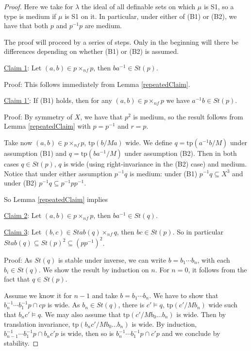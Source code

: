 \documentclass[12pt]{article}
\theoremstyle{definition}
\theoremstyle{mystyle}
\theoremstyle{remark}
\newcommand{\tp}{\mathrm{tp}}
\newcommand{\nf}{\times_{nf}}
\begin{document}
\begin{proof}
Here we take for $\lambda$ the ideal of all definable sets on which $\mu$ is S1, so a type is medium if $\mu$ is S1 on it. In particular, under either of (B1) or (B2), we have that both $p$ and $p^{-1}p$ are medium.

The proof will proceed by a series of steps. Only in the beginning will there be differences depending on whether (B1) or (B2) is assumed.

\smallskip \noindent
\underline{Claim 1}: Let $(a,b)\in p \nf p$, then $ba^{-1}\in St(p)$.

\noindent
Proof: This follows immediately from Lemma \ref{repeatedClaim}.


\smallskip \noindent
\underline{Claim 1'}: If (B1) holds, then for any $(a,b)\in p \nf p$ we have $a^{-1}b\in St(p)$.

\noindent
Proof: By symmetry of $X$, we have that $p^2$ is medium, so the result follows from Lemma \ref{repeatedClaim} with $p=p^{-1}$ and $r=p$.

\medskip

Take now $(a,b)\in p\nf p$, $\tp(b/Ma)$ wide. We define $q=\tp(a^{-1}b/M)$ under assumption (B1) and $q=\tp(ba^{-1}/M)$ under assumption (B2). Then in both cases $q\in St(p)$, $q$ is wide (using right-invariance in the (B2) case) and medium. Notice that under either assumption $p^{-1}q$ is medium: under (B1) $p^{-1}q\subseteq X^3$ and under (B2) $p^{-1}q \subseteq p^{-1}pp^{-1}$.

So Lemma \ref{repeatedClaim} implies

\smallskip \noindent
\underline{Claim 2}: Let $(a,b)\in p \nf p$, then $ba^{-1}\in St(q)$.



\smallskip \noindent
\underline{Claim 3}: Let $(b,c)\in Stab(q)\nf q$, then $bc\in
St(p)$. So in particular $Stab(q)\subseteq St(p)^2 \subseteq
(pp^{-1})^2$.

\noindent
Proof: As $St(q)$ is stable under inverse, we can write $b=b_1\cdots b_n$, with each $b_i \in St(q)$. We show the result by induction on $n$. For $n=0$, it follows from the fact that $q\in St(p)$.

Assume we know it for $n-1$ and take $b=b_1\cdots b_n$. We have to show that $b_n^{-1}\cdots b_1^{-1} p \cap cp$ is wide. As $b_n \in St(q)$, there is $c'\models q$, $\tp(c'/Mb_n)$ wide such that $b_n c' \models q$. We may also assume that $\tp(c'/Mb_0\ldots b_n)$ is wide. Then by translation invariance, $\tp(b_nc'/Mb_0\ldots b_n)$ is wide. By induction, $b_{n-1}^{-1}\cdots b_1^{-1} p \cap b_nc' p$ is wide, then so is $b_n^{-1}\cdots b_1^{-1}p \cap c'p$ and we conclude by stability.


\end{proof}
\end{document}
